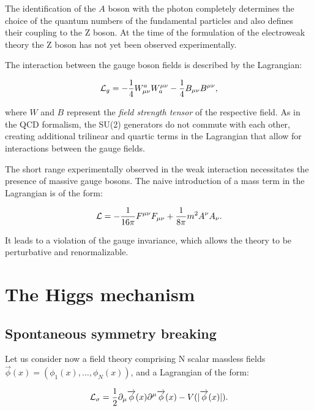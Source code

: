 The identification of the $A$ boson with the photon completely determines the choice of the quantum numbers of the fundamental particles and also defines their coupling to the Z boson. At the time of the formulation of the electroweak theory the Z boson has not yet been observed experimentally.

The interaction between the gauge boson fields is described by the Lagrangian:

\begin{equation}
\mathcal{L}_g = -\dfrac{1}{4}W^a_{\mu\nu}W_a^{\mu\nu} -\dfrac{1}{4}B_{\mu\nu}B^{\mu\nu},
\label{eq:weak_free}
\end{equation}

where $W$ and $B$ represent the \emph{field strength tensor} of the respective field. As in the QCD formalism, the SU(2) generators do not commute with each other, creating additional trilinear and quartic terms in the Lagrangian that allow for interactions between the gauge fields.

The short range experimentally observed in the weak interaction necessitates the presence of massive gauge bosons. The naive introduction of a mass term in the Lagrangian is of the form:

\begin{equation}
\mathcal{L} = -\frac{1}{16\pi}F^{\mu\nu}F_{\mu\nu}+\frac{1}{8\pi}m^2 A^{\nu}A_{\nu}.
\label{eq:weak_free}
\end{equation}

It leads to a violation of the gauge invariance, which allows the theory to be perturbative and renormalizable.

\section{The Higgs mechanism}

\subsection{Spontaneous symmetry breaking}

Let us consider now a field theory comprising N scalar massless fields \\
$\vec{\phi}(x) = (\phi_1(x),\ldots,\phi_N(x))$, and a Lagrangian of the form:

\begin{equation}
\mathcal{L}_\sigma = \dfrac{1}{2} \partial_\mu \overrightarrow{\phi}(x) \partial^\mu \overrightarrow{\phi}(x) - V(|\overrightarrow{\phi}(x)|).
\label{eq:lin_sigma}
\end{equation}

